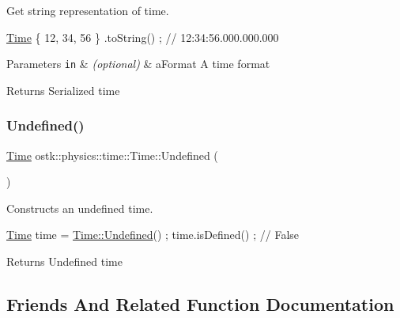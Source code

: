 Get string representation of time. 


\begin{DoxyCode}
\hyperlink{classostk_1_1physics_1_1time_1_1_time_a9609e75d328ed240f6fc4529e26038cc}{Time} \{ 12, 34, 56 \} .toString() ; \textcolor{comment}{// 12:34:56.000.000.000}
\end{DoxyCode}



\begin{DoxyParams}[1]{Parameters}
\mbox{\tt in}  & {\em (optional)} & a\+Format A time format \\
\hline
\end{DoxyParams}
\begin{DoxyReturn}{Returns}
Serialized time 
\end{DoxyReturn}
\mbox{\label{classostk_1_1physics_1_1time_1_1_time_a17c9ae2f4fa9c8a48a558fa49c511e03}} 
\subsubsection{\texorpdfstring{Undefined()}{Undefined()}}
{\footnotesize\ttfamily \hyperlink{classostk_1_1physics_1_1time_1_1_time}{Time} ostk\+::physics\+::time\+::\+Time\+::\+Undefined (\begin{DoxyParamCaption}{ }\end{DoxyParamCaption})\hspace{0.3cm}{\ttfamily [static]}}



Constructs an undefined time. 


\begin{DoxyCode}
\hyperlink{classostk_1_1physics_1_1time_1_1_time_a9609e75d328ed240f6fc4529e26038cc}{Time} time = \hyperlink{classostk_1_1physics_1_1time_1_1_time_a17c9ae2f4fa9c8a48a558fa49c511e03}{Time::Undefined}() ;
time.isDefined() ; \textcolor{comment}{// False}
\end{DoxyCode}


\begin{DoxyReturn}{Returns}
Undefined time 
\end{DoxyReturn}


\subsection{Friends And Related Function Documentation}
\mbox{\label{classostk_1_1physics_1_1time_1_1_time_a181948621d8fe0d85bdfc97af30b62fb}} 
